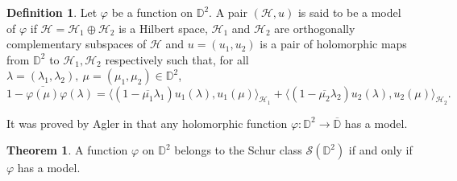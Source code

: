 \documentclass[12pt,reqno]{amsart}
\numberwithin{equation}{section}
\renewcommand\phi{\varphi}
\theoremstyle{definition}
\newtheorem{defin}[equation]{Definition}
\newtheorem{thm}[equation]{Theorem}
\begin{document}
\begin{defin}{}\label{modelonbidisc}
 Let $\varphi$ be a function on $\mathbb{D}^{2}$. A pair $(\mathcal{H},u)$ is said to be a model of $\varphi$ if $\mathcal{H}=\mathcal{H}_{1}\oplus\mathcal{H}_{2}$ is a Hilbert space, $\mathcal{H}_{1}$ and $\mathcal{H}_{2}$ are orthogonally complementary subspaces of $\mathcal{H}$ and $u=(u_{1},u_{2})$ is a pair of holomorphic maps from $\mathbb{D}^{2}$ to $\mathcal{H}_{1},\mathcal{H}_{2}$ respectively such that, for all $\lambda=(\lambda_1, \lambda_2), \ \mu= (\mu_1, \mu_2) \in \mathbb{D}^{2}$, 
\begin{equation}\label{modelonbidiscformula}
1-\overline{\varphi(\mu)}\varphi(\lambda) = \big\langle(1-\overline{\mu_{1}}\lambda_{1}) u_{1}({\lambda}),u_{1}({\mu})\big\rangle_{\mathcal{H}_{1}}+\big\langle(1-\overline{\mu_{2}}\lambda_{2}) u_{2}({\lambda}),u_{2}(\mu)\big\rangle_{\mathcal{H}_{2}}.
\end{equation}
\end{defin}

It was proved by Agler in \cite{RepresentationOfCertainHolomorphicFunctions} that any holomorphic function $\varphi: \mathbb{D}^{2} \to \overline{\mathbb{D}}$ has a model.

\begin{thm}{}\label{aglerstheorembidisc}
A function $\phi$ on $\mathbb{D}^{2}$ belongs to the Schur class  $\mathcal{S}(\mathbb{D}^{2})$ if and only if $\phi$ has a model. 
\end{thm}
\end{document}

